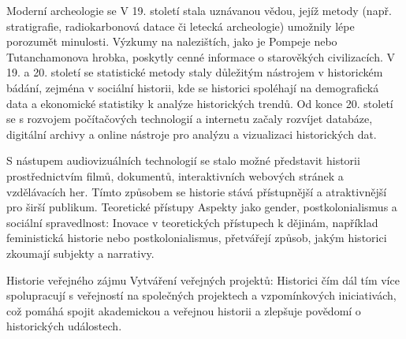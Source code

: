 \documentclass[a4paper,12pt,twoside,FP]{article}
\begin{document}
Moderní archeologie se V 19. století stala uznávanou vědou, jejíž metody (např. stratigrafie, radiokarbonová datace či letecká archeologie) umožnily lépe porozumět minulosti. Výzkumy na nalezištích, jako je Pompeje nebo Tutanchamonova hrobka, poskytly cenné informace o starověkých civilizacích. V 19. a 20. století se statistické metody staly důležitým nástrojem v historickém bádání, zejména v sociální historii, kde se historici spoléhají na demografická data a ekonomické statistiky k analýze historických trendů. Od konce 20. století se s rozvojem počítačových technologií a internetu začaly rozvíjet databáze, digitální archivy a online nástroje pro analýzu a vizualizaci historických dat.

S nástupem audiovizuálních technologií se stalo možné představit historii prostřednictvím filmů, dokumentů, interaktivních webových stránek a vzdělávacích her. Tímto způsobem se historie stává přístupnější a atraktivnější pro širší publikum. Teoretické přístupy Aspekty jako gender, postkolonialismus a sociální spravedlnost: Inovace v teoretických přístupech k dějinám, například feministická historie nebo postkolonialismus, přetvářejí způsob, jakým historici zkoumají subjekty a narrativy.

Historie veřejného zájmu Vytváření veřejných projektů: Historici čím dál tím více spolupracují s veřejností na společných projektech a vzpomínkových iniciativách, což pomáhá spojit akademickou a veřejnou historii a zlepšuje povědomí o historických událostech.
\end{document}
